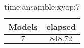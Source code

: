 \begin{table}[!ht]
	\centering
	\begin{tabular}{|c|c|}
		\hline
		Models & elapsed \\ \hline
		$7$ & $848.72$ \\ \hline
	\end{tabular}
	\caption{time:ansamble:xyap:7}
	\label{tab:time:ansamble:xyap:7}
\end{table}
